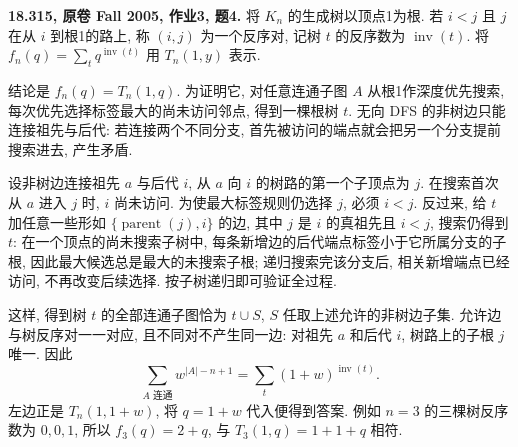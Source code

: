 \begin{exercise}\label{mit:18315-hw3-q4}
\textbf{18.315, 原卷 Fall 2005, 作业3, 题4.}
将 $K_n$ 的生成树以顶点1为根.
若 $i<j$ 且 $j$ 在从 $i$ 到根1的路上, 称 $(i,j)$ 为一个反序对,
记树 $t$ 的反序数为 $\operatorname{inv}(t)$.
将 $f_n(q)=\sum_t q^{\operatorname{inv}(t)}$ 用 $T_n(1,y)$ 表示.
\end{exercise}
\begin{solution}
结论是 $f_n(q)=T_n(1,q)$. 为证明它, 对任意连通子图 $A$ 从根1作深度优先搜索,
每次优先选择标签最大的尚未访问邻点, 得到一棵根树 $t$.
无向 DFS 的非树边只能连接祖先与后代:
若连接两个不同分支, 首先被访问的端点就会把另一个分支提前搜索进去, 产生矛盾.

设非树边连接祖先 $a$ 与后代 $i$, 从 $a$ 向 $i$ 的树路的第一个子顶点为 $j$.
在搜索首次从 $a$ 进入 $j$ 时, $i$ 尚未访问.
为使最大标签规则仍选择 $j$, 必须 $i<j$.
反过来, 给 $t$ 加任意一些形如 $\{\operatorname{parent}(j),i\}$ 的边,
其中 $j$ 是 $i$ 的真祖先且 $i<j$, 搜索仍得到 $t$:
在一个顶点的尚未搜索子树中, 每条新增边的后代端点标签小于它所属分支的子根,
因此最大候选总是最大的未搜索子根;
递归搜索完该分支后, 相关新增端点已经访问, 不再改变后续选择.
按子树递归即可验证全过程.

这样, 得到树 $t$ 的全部连通子图恰为 $t\cup S$,
$S$ 任取上述允许的非树边子集. 允许边与树反序对一一对应,
且不同对不产生同一边: 对祖先 $a$ 和后代 $i$, 树路上的子根 $j$ 唯一.
因此
\[
\sum_{A\text{ 连通}}w^{|A|-n+1}
=\sum_t(1+w)^{\operatorname{inv}(t)}.
\]
左边正是 $T_n(1,1+w)$, 将 $q=1+w$ 代入便得到答案.
例如 $n=3$ 的三棵树反序数为 $0,0,1$, 所以 $f_3(q)=2+q$,
与 $T_3(1,q)=1+1+q$ 相符.
\end{solution}

